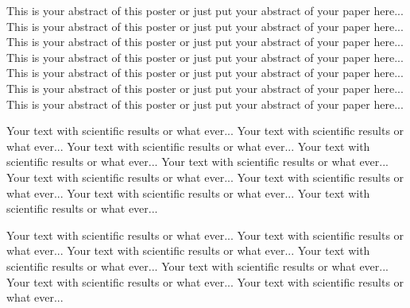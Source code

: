 \documentclass[landscape,a0b,final]{a0poster}
\newenvironment{poster}{
  \begin{center}
  \begin{minipage}[c]{0.98\textwidth}
}{
  \end{minipage} 
  \end{center}
}
\newenvironment{pcolumn}[1]{
  \begin{minipage}{#1\textwidth}
  \begin{center}
}{
  \end{center}
  \end{minipage}
}
\newcommand{\pbox}[4]{
\psshadowbox[#3]{
\begin{minipage}[t][#2][t]{#1}
#4
\end{minipage}
}}
\begin{document}
\begin{poster}
\begin{center}
\begin{pcolumn}{0.32}
{%
\begin{center}\pbox{0.8\textwidth}{}{linewidth=2mm,framearc=0.1,linecolor=lightblue,fillstyle=gradient,gradangle=0,gradbegin=white,gradend=whiteblue,gradmidpoint=1.0,framesep=1em}{\begin{center}Abstract\end{center}}\end{center}
\vspace{1.25cm}

This is your abstract of this poster or just put your abstract of your
paper here... This is your abstract of this poster or just put your
abstract of your paper here... This is your abstract of this poster or
just put your abstract of your paper here... This is your abstract of
this poster or just put your abstract of your paper here... This is
your abstract of this poster or just put your abstract of your paper
here... This is your abstract of this poster or just put your abstract
of your paper here... This is your abstract of this poster or just put
your abstract of your paper here...



\vspace{2cm}\begin{center}\pbox{0.8\textwidth}{}{linewidth=2mm,framearc=0.1,linecolor=lightblue,fillstyle=gradient,gradangle=0,gradbegin=white,gradend=whiteblue,gradmidpoint=1.0,framesep=1em}{\begin{center}Introduction\end{center}}\end{center}\vspace{1.25cm}

Your text with scientific results or what ever... Your text with
scientific results or what ever... Your text with scientific results or
what ever... Your text with scientific results or what ever... Your
text with scientific results or what ever... Your text with scientific
results or what ever... Your text with scientific results or what
ever... Your text with scientific results or what ever... Your text
with scientific results or what ever...

Your text with scientific results or what ever... Your text with
scientific results or what ever... Your text with scientific results or
what ever... Your text with scientific results or what ever... Your
text with scientific results or what ever... Your text with scientific
results or what ever... Your text with scientific results or what
ever...
}
\end{pcolumn}
\begin{pcolumn}{0.32}
\pbox{0.9\textwidth}{30cm}{linewidth=2mm,framearc=0.1,linecolor=lightblue,fillstyle=gradient,gradangle=0,gradbegin=white,gradend=white,gradmidpoint=1.0,framesep=1em}{

}
\end{pcolumn}
\end{center}
\end{poster}
\end{document}
